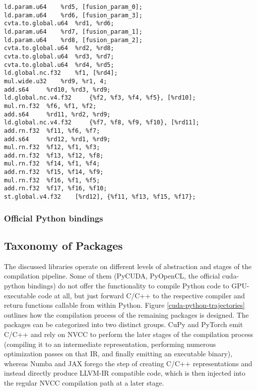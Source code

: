 \documentclass[english,11pt,a4paper,table]{article} %
\begin{document}
\begin{verbatim}
ld.param.u64 	%rd5, [fusion_param_0];
ld.param.u64 	%rd6, [fusion_param_3];
cvta.to.global.u64 	%rd1, %rd6;
ld.param.u64 	%rd7, [fusion_param_1];
ld.param.u64 	%rd8, [fusion_param_2];
cvta.to.global.u64 	%rd2, %rd8;
cvta.to.global.u64 	%rd3, %rd7;
cvta.to.global.u64 	%rd4, %rd5;
ld.global.nc.f32 	%f1, [%rd4];
mul.wide.u32 	%rd9, %r1, 4;
add.s64 	%rd10, %rd3, %rd9;
ld.global.nc.v4.f32 	{%f2, %f3, %f4, %f5}, [%rd10];
mul.rn.f32 	%f6, %f1, %f2;
add.s64 	%rd11, %rd2, %rd9;
ld.global.nc.v4.f32 	{%f7, %f8, %f9, %f10}, [%rd11];
add.rn.f32 	%f11, %f6, %f7;
add.s64 	%rd12, %rd1, %rd9;
mul.rn.f32 	%f12, %f1, %f3;
add.rn.f32 	%f13, %f12, %f8;
mul.rn.f32 	%f14, %f1, %f4;
add.rn.f32 	%f15, %f14, %f9;
mul.rn.f32 	%f16, %f1, %f5;
add.rn.f32 	%f17, %f16, %f10;
st.global.v4.f32 	[%rd12], {%f11, %f13, %f15, %f17};
\end{verbatim}

\subsubsection{Official Python bindings}

\subsection{Taxonomy of Packages}

The discussed libraries operate on different levels of abstraction and stages of the compilation pipeline.
Some of them (PyCUDA, PyOpenCL, the official cuda-python bindings) do not offer the functionality to compile Python code to GPU-executable code at all, but just forward C/C++ to the respective compiler and return functions callable from within Python.
Figure \ref{cuda-python-trajectories} outlines how the compilation process of the remaining packages is designed.
The packages can be categorized into two distinct groups.
CuPy and PyTorch emit C/C++ and rely on NVCC to perform the later stages of the compilation process (compiling it to an intermediate representation, performing numerous optimization passes on that IR, and finally emitting an executable binary), whereas Numba and JAX forego the step of creating C/C++ representations and instead directly produce LLVM-IR compatible code, which is then injected into the regular NVCC compilation path at a later stage.
\end{document}

